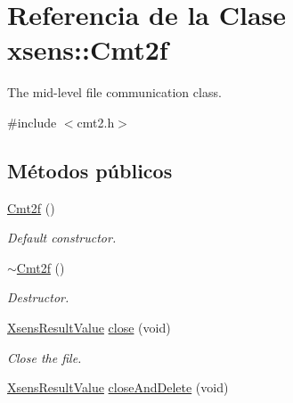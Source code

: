 \hypertarget{classxsens_1_1Cmt2f}{\section{\-Referencia de la \-Clase xsens\-:\-:\-Cmt2f}
\label{classxsens_1_1Cmt2f}
}


\-The mid-\/level file communication class.  




{\ttfamily \#include $<$cmt2.\-h$>$}

\subsection*{\-Métodos públicos}
\begin{DoxyCompactItemize}
\item 
\hypertarget{classxsens_1_1Cmt2f_a90560cd7201013b5d891ec589e05df6e}{\hyperlink{classxsens_1_1Cmt2f_a90560cd7201013b5d891ec589e05df6e}{\-Cmt2f} ()}\label{classxsens_1_1Cmt2f_a90560cd7201013b5d891ec589e05df6e}

\begin{DoxyCompactList}\small\item\em \-Default constructor. \end{DoxyCompactList}\item 
\hypertarget{classxsens_1_1Cmt2f_a2dbf1f3cbff23f7d9ff091a12eef1eec}{\hyperlink{classxsens_1_1Cmt2f_a2dbf1f3cbff23f7d9ff091a12eef1eec}{$\sim$\-Cmt2f} ()}\label{classxsens_1_1Cmt2f_a2dbf1f3cbff23f7d9ff091a12eef1eec}

\begin{DoxyCompactList}\small\item\em \-Destructor. \end{DoxyCompactList}\item 
\hypertarget{classxsens_1_1Cmt2f_a4aef4b12a2764c6f1022a43e48100040}{\hyperlink{group__enums_ga822a2260a20af524029eef9e9a51ff6f}{\-Xsens\-Result\-Value} \hyperlink{classxsens_1_1Cmt2f_a4aef4b12a2764c6f1022a43e48100040}{close} (void)}\label{classxsens_1_1Cmt2f_a4aef4b12a2764c6f1022a43e48100040}

\begin{DoxyCompactList}\small\item\em \-Close the file. \end{DoxyCompactList}\item 
\hypertarget{classxsens_1_1Cmt2f_a59b667c6fb15792d45f207ddbee02caf}{\hyperlink{group__enums_ga822a2260a20af524029eef9e9a51ff6f}{\-Xsens\-Result\-Value} \hyperlink{classxsens_1_1Cmt2f_a59b667c6fb15792d45f207ddbee02caf}{close\-And\-Delete} (void)}\label{classxsens_1_1Cmt2f_a59b667c6fb15792d45f207ddbee02caf}


\end{DoxyCompactItemize}
